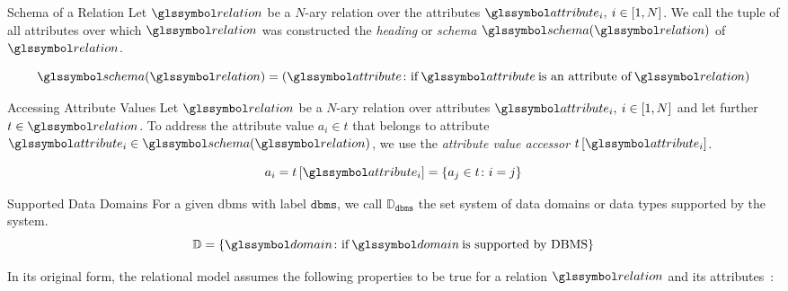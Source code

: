\begin{definition}[label=definition:rel_schema]{Schema of a Relation}{}
    Let $\relation$ be a $N$-ary relation over the attributes $\attribute_i, \: i \in \left[1, N \right]$. We call the tuple of all attributes over which $\relation$ was constructed the \emph{heading} or \emph{schema} $\schema (\relation)$ of $\relation$.

    \begin{equation*}
        \schema (\relation) = \left( \attribute \colon \textrm{if} \: \attribute \: \textrm{is an attribute of} \: \relation \right)
    \end{equation*}   
\end{definition}

\begin{definition}[label=definition:rel_attribute_value]{Accessing Attribute Values}{}
    Let $\relation$ be a $N$-ary relation over attributes $\attribute_i, \: i \in \left[1, N \right]$ and let further $t \in \relation$. To address the attribute value $a_i \in t$ that belongs to attribute $\attribute_i \in \schema(\relation) $, we use the \emph{attribute value accessor} $t\left[ \attribute_i \right]$.

    \begin{equation*}
        a_i = t\left[ \attribute_i \right] = \{ a_j \in t \colon i = j \}
    \end{equation*}  
\end{definition}

\begin{definition}[label=definition:rel_domains]{Supported Data Domains}{}
    For a given \acrshort{dbms} with label $\mathtt{dbms}$, we call $\mathbb{D}_{\mathtt{dbms}}$ the set system of data domains or data types supported by the system.
    \begin{equation*}
        \mathbb{D} = \{ \domain \colon \textrm{if} \: \domain \: \textrm{is supported by DBMS} \}
    \end{equation*}
\end{definition}

In its original form, the relational model assumes the following properties to be true for a relation $\relation$ and its attributes~\cite{Codd:1970Relational}:

